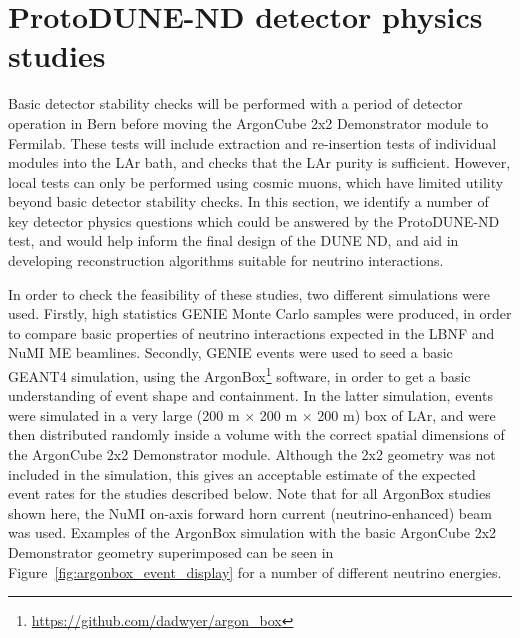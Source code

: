 \section{ProtoDUNE-ND detector physics studies}
\label{sec:detector-physics-studies}
Basic detector stability checks will be performed with a period of detector operation in Bern before moving the ArgonCube 2x2 Demonstrator module to Fermilab. These tests will include extraction and re-insertion tests of individual modules into the LAr bath, and checks that the LAr purity is sufficient. However, local tests can only be performed using cosmic muons, which have limited utility beyond basic detector stability checks. In this section, we identify a number of key detector physics questions which could be answered by the ProtoDUNE-ND test, and would help inform the final design of the DUNE ND, and aid in developing reconstruction algorithms suitable for neutrino interactions.

In order to check the feasibility of these studies, two different simulations were used. Firstly, high statistics GENIE Monte Carlo samples were produced, in order to compare basic properties of neutrino interactions expected in the LBNF and NuMI ME beamlines. Secondly, GENIE events were used to seed a basic GEANT4 simulation, using the ArgonBox\footnote{\url{https://github.com/dadwyer/argon_box}} software, in order to get a basic understanding of event shape and containment. In the latter simulation, events were simulated in a very large (200 m $\times$ 200 m $\times$ 200 m) box of LAr, and were then distributed randomly inside a volume with the correct spatial dimensions of the ArgonCube 2x2 Demonstrator module. Although the 2x2 geometry was not included in the simulation, this gives an acceptable estimate of the expected event rates for the studies described below. Note that for all ArgonBox studies shown here, the NuMI on-axis forward horn current (neutrino-enhanced) beam was used. Examples of the ArgonBox simulation with the basic ArgonCube 2x2 Demonstrator geometry superimposed can be seen in Figure~\ref{fig:argonbox_event_display} for a number of different neutrino energies.


